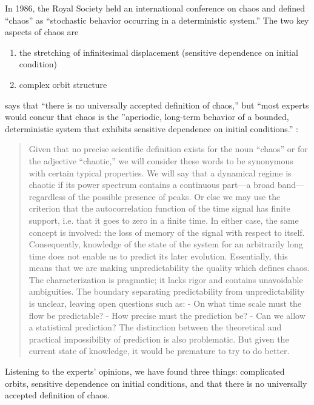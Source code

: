 \documentclass[10pt,twoside,draft]{book}
\begin{document}
In 1986, the Royal Society held an international conference on chaos and defined ``chaos'' as ``stochastic behavior occurring in a deterministic system.'' \citep{stewart}
The two key aspects of chaos are \citep[p.31]{abarbanel,ott1994} %
\begin{enumerate}
  \item the stretching of infinitesimal displacement (sensitive dependence on initial condition) 
  \item complex orbit structure
\end{enumerate}
\citet[p.104]{sprott} says that ``there is no universally accepted definition of chaos,'' but ``most experts would concur that chaos is the ''aperiodic, long-term behavior of a bounded, deterministic system that exhibits sensitive dependence on initial conditions.''
\citet[p.103]{berge}:
\begin{quotation}
  Given that no precise scientific definition exists for the noun ``chaos'' or for the adjective ``chaotic,'' we will consider these words to be synonymous with certain typical properties.
  We will say that a dynamical regime is chaotic if its power spectrum contains a continuous part---a broad band---regardless of the possible presence of peaks.
  Or else we may use the criterion that the autocorrelation function of the time signal has finite support, i.e. that it goes to zero in a finite time.
  In either case, the same concept is involved: the loss of memory of the signal with respect to itself.
  Consequently, knowledge of the state of the system for an arbitrarily long time does not enable us to predict its later evolution.
  Essentially, this means that we are making unpredictability the quality which defines chaos.
  The characterization is pragmatic; it lacks rigor and contains unavoidable ambiguities.
  The boundary separating predictability from unpredictability is unclear, leaving open questions such as:
  - On what time scale must the flow be predictable?
  - How precise must the prediction be?
  - Can we allow a statistical prediction?
  The distinction between the theoretical and practical impossibility of prediction is also problematic.
  But given the current state of knowledge, it would be premature to try to do better.
\end{quotation}
Listening to the experts' opinions, we have found three things: complicated orbits, sensitive dependence on initial conditions, and that there is no universally accepted definition of chaos.
\end{document}
